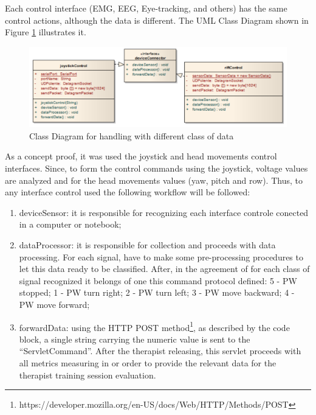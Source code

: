Each control interface (EMG, EEG, Eye-tracking, and others) has the same control actions, although the data is different. The UML Class Diagram shown in Figure \ref{fig:deviceData} illustrates it.

\begin{figure}[!hbt]
\begin{center}
\includegraphics[width=1\linewidth]{img/cap5/deviceData}
\caption{Class Diagram for handling with different class of data} \label{fig:deviceData}
\end{center}
\end{figure}


As a concept proof, it was used the joystick and head movements control interfaces. Since, to form the control commands using the joystick, voltage values are analyzed and for the head movements values (yaw, pitch and row). Thus, to any interface control used the following workflow will be followed:

\begin{enumerate}
\item deviceSensor: it is responsible for recognizing each interface controle conected in a computer or notebook; 
\item dataProcessor: it is responsible for collection and proceeds with data processing. For each signal, have to make some pre-processing procedures to let this data ready to be classified. After, in the agreement of for each class of signal recognized it belongs of one this command protocol defined: 5 - PW stopped; 1 - PW turn right; 2 - PW turn left; 3 - PW move backward; 4 - PW move forward;
\item forwardData: using the HTTP POST method\footnote{https://developer.mozilla.org/en-US/docs/Web/HTTP/Methods/POST}, as described by the code block, a single string carrying the numeric value is sent to the ``ServletCommand''. After the therapist releasing, this servlet proceeds with all metrics measuring in or order to provide the relevant data for the therapist training session evaluation.
\end{enumerate}


